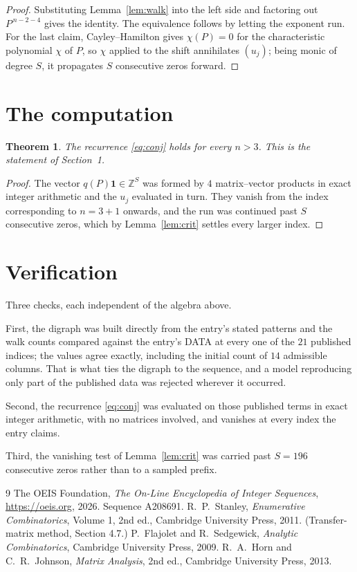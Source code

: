 \documentclass[11pt,a4paper]{article}
\theoremstyle{plain}
\newtheorem{theorem}{Theorem}
\theoremstyle{definition}
\begin{document}
\begin{proof}
Substituting Lemma~\ref{lem:walk} into the left side and factoring out
$P^{\,n-2-4}$ gives the identity. The equivalence follows by letting the exponent
run. For the last claim, Cayley--Hamilton gives $\chi(P)=0$ for the characteristic
polynomial $\chi$ of $P$, so $\chi$ applied to the shift annihilates $(u_j)$; being monic of
degree $S$, it propagates $S$ consecutive zeros forward.
\end{proof}

\section{The computation}

\begin{theorem}
The recurrence \eqref{eq:conj} holds for every $n>3$. This is the statement of
Section~1.
\end{theorem}

\begin{proof}
The vector $q(P)\mathbf{1}\in\mathbb{Z}^{S}$ was formed by $4$ matrix--vector
products in exact integer arithmetic and the $u_j$ evaluated in turn. They vanish from the
index corresponding to $n=3+1$ onwards, and the run was continued past $S$ consecutive
zeros, which by Lemma~\ref{lem:crit} settles every larger index.
\end{proof}

\section{Verification}

Three checks, each independent of the algebra above.

First, the digraph was built directly from the entry's stated patterns and the walk counts
compared against the entry's DATA at every one of the $21$ published indices; the
values agree exactly, including the initial count of $14$ admissible columns. That is
what ties the digraph to the sequence, and a model reproducing only part of the published
data was rejected wherever it occurred.

Second, the recurrence \eqref{eq:conj} was evaluated on those published terms in exact
integer arithmetic, with no matrices involved, and vanishes at every index the entry claims.

Third, the vanishing test of Lemma~\ref{lem:crit} was carried past $S=196$ consecutive
zeros rather than to a sampled prefix.

\begin{thebibliography}{9}
 The OEIS Foundation, \emph{The On-Line Encyclopedia of Integer
Sequences}, \url{https://oeis.org}, 2026. Sequence A208691.
 R.~P.~Stanley, \emph{Enumerative Combinatorics}, Volume 1, 2nd ed.,
Cambridge University Press, 2011. (Transfer-matrix method, Section 4.7.)
 P.~Flajolet and R.~Sedgewick, \emph{Analytic Combinatorics}, Cambridge
University Press, 2009.
 R.~A.~Horn and C.~R.~Johnson, \emph{Matrix Analysis}, 2nd ed., Cambridge
University Press, 2013.
\end{thebibliography}
\end{document}
